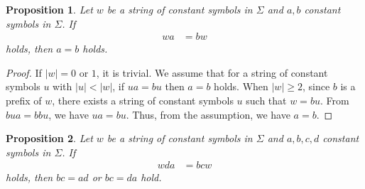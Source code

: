\newtheorem{prop}{Proposition}
\newcommand{\pair}[2]{#1#2}
\newcommand{\TheConditionA}{$bc \not\in \{aa, ad, da, dd\}$}
\newcommand{\TheConditionB}{$bc \not\in \{da, dd\}$}
\newcommand{\theconditionC}{$bc \not\in \{aa, da\}$}


\begin{prop}\label{prop:repstring_base}\label{prop:repstring_orig}
  Let $w$ be a string of constant symbols in $\Sigma$ and $a,b$ constant symbols in $\Sigma$.
  If
  \begin{align}
  wa & = bw\label{prop:repstring_orig_eq}
  \end{align}
  holds, then $a = b$ holds.
\end{prop}

\begin{proof}
If $|w|=0$ or $1$, it is trivial. We assume that for a string of constant symbols $u$ with $|u| < |w|$, if $ua = bu$ then $a = b$ holds. When $|w| \geq 2$, since $b$ is a prefix of $w$, there exists a string of constant symbols $u$ such that $w = bu$. From $bua = bbu$, we have $ua = bu$. Thus, from the assumption, we have $a = b$.  
\end{proof}


\begin{prop}\label{prop:repstring_base}
Let $w$ be a string of constant symbols in $\Sigma$ and $a,b,c,d$ constant symbols in $\Sigma$.
If
\begin{align}
wda & = bcw\label{prop:repstring_base_eq}
\end{align}
holds, then $\pair{b}{c} = \pair{a}{d}$ or $\pair{b}{c} = \pair{d}{a}$ hold.
\end{prop}

